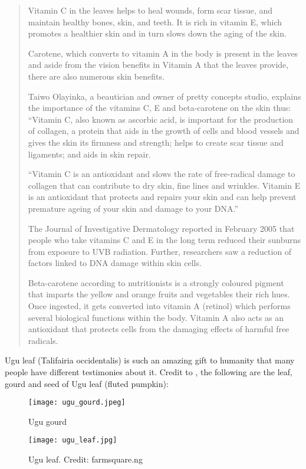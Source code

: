 \begin{quotation}
	Vitamin C in the leaves helps to heal wounds, form scar tissue, and maintain healthy bones, skin, and teeth. It is rich in vitamin E, which promotes a healthier skin and in turn slows down the aging of the skin.
	
	Carotene, which converts to vitamin A in the body is present in the leaves and aside from the vision benefits in Vitamin A that the leaves provide, there are also numerous skin benefits.
	
	
	Taiwo Olayinka, a beautician and owner of pretty concepts studio, explains the importance of the vitamins C, E and beta-carotene on the skin thus: “Vitamin C, also known as ascorbic acid, is important for the production of collagen, a protein that aids in the growth of cells and blood vessels and gives the skin its firmness and strength; helps to create scar tissue and ligaments; and aids in skin repair.
	
	“Vitamin C is an antioxidant and slows the rate of free-radical damage to collagen that can contribute to dry skin, fine lines and wrinkles. Vitamin E is an antioxidant that protects and repairs your skin and can help prevent premature ageing of your skin and damage to your DNA.”
	
	The Journal of Investigative Dermatology reported in February 2005 that people who take vitamins C and E in the long term reduced their sunburns from exposure to UVB radiation. Further, researchers saw a reduction of factors linked to DNA damage within skin cells.
	
	Beta-carotene according to nutritionists is a strongly coloured pigment that imparts the yellow and orange fruits and vegetables their rich hues. Once ingested, it gets converted into vitamin A (retinol) which performs several biological functions within the body. Vitamin A also acts as an antioxidant that protects cells from the damaging effects of harmful free radicals.
\end{quotation}

Ugu leaf (Talifairia occidentalis) is such an amazing gift to humanity that many people have different testimonies about it. Credit to \citep{7AmazingUses}, the following are the leaf, gourd and seed of Ugu leaf (fluted pumpkin): 

\begin{figure}[!h]
	\centering
	\texttt{[image: ugu\_gourd.jpeg]}
	\caption{Ugu gourd} 
	\label{fig:ugu_leaf}
\end{figure}
\newpage
\begin{figure}[!h]
	\centering
	\texttt{[image: ugu\_leaf.jpg]}
	\caption{Ugu leaf. Credit: farmsquare.ng} 
	\label{fig:ugu_leaf}
\end{figure}

